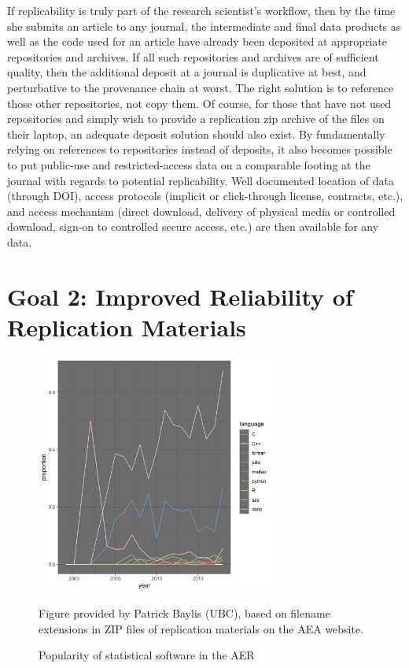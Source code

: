 \documentclass[AEJ]{AEA}
\begin{document}
If replicability is truly part of the research scientist's workflow, then by the time she submits an article to any journal, the intermediate and final data products as well as the code used for an article have already been deposited at appropriate repositories and archives. If all such repositories and archives are of sufficient quality, then the additional deposit at a journal is duplicative at best, and perturbative to the provenance chain at worst. The right solution is to reference those other repositories, not copy them. Of course, for those that have not used repositories and simply wish to provide a replication zip archive of the files on their laptop, an adequate deposit solution should also exist.
By fundamentally relying on references to repositories instead of deposits, it also becomes possible to put public-use and restricted-access data on a comparable footing at the journal with regards to potential replicability. Well documented location of data (through DOI), access protocols (implicit or click-through license, contracts, etc.), and access mechanism (direct download, delivery of physical media or controlled download, sign-on to controlled secure access, etc.) are then available for any data.

\section{Goal 2: Improved Reliability of Replication Materials}
\begin{figure}
    \centering
\includegraphics[width=0.7\textwidth]{images/aer_programs_by_year.png}
    \caption{Popularity of statistical software in the AER}
    \label{fig:aer_programs_by_year}
    \footnotesize Figure provided by Patrick Baylis (UBC), based on filename extensions in ZIP files of replication materials on the AEA website.
\end{figure}
\end{document}
